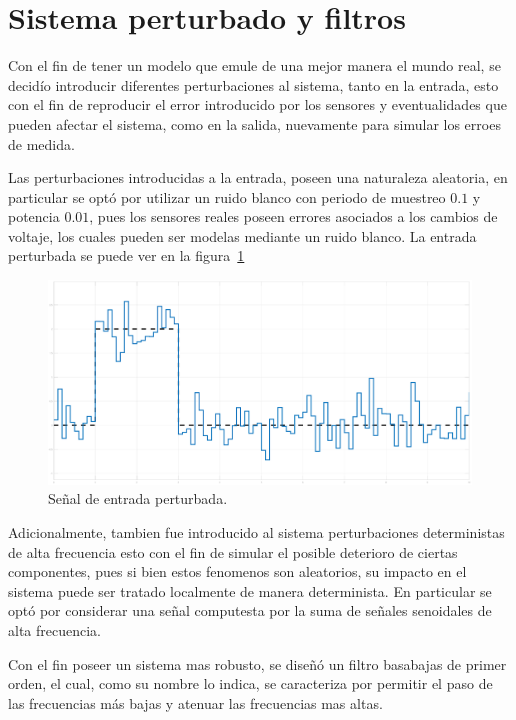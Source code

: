 \section{Sistema perturbado y filtros}
Con el fin de tener un modelo que emule de una mejor manera el mundo real,
se decidío introducir diferentes perturbaciones al sistema, tanto en la
entrada, esto con el fin de reproducir el error introducido por los sensores
y eventualidades que pueden afectar el sistema, como en la salida, nuevamente
para simular los erroes de medida.

Las perturbaciones introducidas a la entrada, poseen una naturaleza aleatoria,
en particular se optó por utilizar un ruido blanco con periodo de
muestreo $0.1$ y potencia $0.01$, pues los sensores reales poseen errores
asociados a los cambios de voltaje, los cuales pueden ser modelas mediante un
ruido blanco.
La entrada perturbada se puede ver en la figura~\ref{fig:entrada-ruido}

\begin{figure}[t]
  \label{fig:entrada-ruido}
  \includegraphics[scale=1]{Figuras/entrada}
  \caption{Señal de entrada perturbada.} 
\end{figure}

Adicionalmente, tambien fue introducido al sistema perturbaciones deterministas
de alta frecuencia esto con el fin de simular el posible deterioro de ciertas
componentes, pues si bien estos fenomenos son aleatorios, su impacto en el sistema
puede ser tratado localmente de manera determinista. En particular se optó por
considerar una señal computesta por la suma de señales senoidales de alta frecuencia.

Con el fin poseer un sistema mas robusto, se diseñó un filtro basabajas de primer orden,
el cual, como su nombre lo indica, se caracteriza por permitir el paso de las frecuencias
más bajas y atenuar las frecuencias mas altas.

